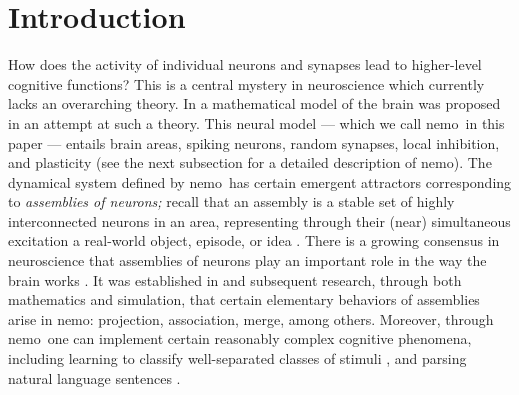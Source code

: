 \documentclass[12pt,nosubfloats]{alt2024} %
\newcommand{\1}{\mathbbm{1}}
\begin{document}
\def\name{{\sc nemo}}

\section{Introduction}

How does the activity of individual neurons and synapses lead to higher-level cognitive functions? This is a central mystery in neuroscience which currently lacks an overarching theory. In \citet{papadimitriou2020brain} a mathematical model of the brain was proposed in an attempt at such a theory.  This neural model --- which we call \name\ in this paper --- entails brain areas, spiking neurons, random synapses, local inhibition, and plasticity (see the next subsection for a detailed description of \name).   The dynamical system defined by \name\ has certain emergent attractors corresponding to {\em assemblies of neurons;} recall that an assembly is a stable set of highly interconnected neurons in an area, representing through their (near) simultaneous excitation a real-world object, episode, or idea \citep{hebb1949organization, harris2003organization, buzsaki2019brain}.  There is a growing consensus in neuroscience that assemblies of neurons play an important role in the way the brain works \citep{buzsaki2010neural, huyck2013review, yuste2015neuron, eichenbaum2018barlow}.  It was established in \citet{papadimitriou2020brain} and subsequent research, through both mathematics and simulation, that certain elementary behaviors of assemblies arise in \name:  projection, association, merge, among others. Moreover, through \name\  one can implement certain reasonably complex cognitive phenomena, including learning to classify well-separated classes of stimuli \citep{dabagia2022assemblies}, and parsing natural language sentences \citep{mitropolsky2021biologically}.
\end{document}
